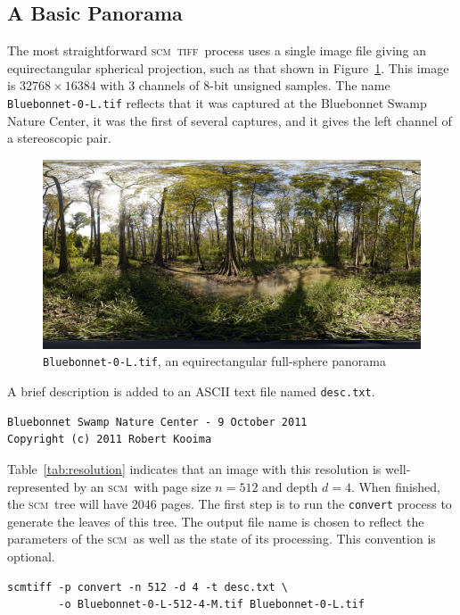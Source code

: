 \documentclass[oneside,10pt]{memoir}
\newcommand{\scm}     {\textsc{scm}}
\newcommand{\tiff}    {\textsc{tiff}}
\begin{document}
\begin{Spacing}{1.1}
\subsection{A Basic Panorama}
\label{sec:panorama}

The most straightforward \scm\ \tiff\ process uses a single image file giving an equirectangular spherical projection, such as that shown in Figure~\ref{fig:bluebonnet}. This image is $\num{32768}\times\num{16384}$ with 3 channels of 8-bit unsigned samples. The name \texttt{Bluebonnet-0-L.tif} reflects that it was captured at the Bluebonnet Swamp Nature Center, it was the first of several captures, and it gives the left channel of a stereoscopic pair.

\begin{figure}
  \centering
  \includegraphics[width=\textwidth]{fig/bluebonnet.png}
  \caption{\texttt{Bluebonnet-0-L.tif}, an equirectangular full-sphere panorama}
  \label{fig:bluebonnet}
\end{figure}

A brief description is added to an ASCII text file named \texttt{desc.txt}.

\begin{Verbatim}
Bluebonnet Swamp Nature Center - 9 October 2011
Copyright (c) 2011 Robert Kooima
\end{Verbatim}

Table~\ref{tab:resolution} indicates that an image with this resolution is well-represented by an \scm\ with page size $n=512$ and depth $d=4$. When finished, the \scm\ tree will have $2046$ pages. The first step is to run the \texttt{convert} process to generate the leaves of this tree. The output file name is chosen to reflect the parameters of the \scm\ as well as the state of its processing. This convention is optional.

\begin{Verbatim}
scmtiff -p convert -n 512 -d 4 -t desc.txt \
        -o Bluebonnet-0-L-512-4-M.tif Bluebonnet-0-L.tif
\end{Verbatim}


\end{Spacing}
\end{document}

